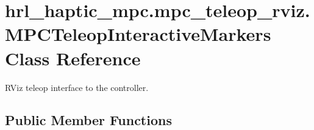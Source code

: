 \hypertarget{classhrl__haptic__mpc_1_1mpc__teleop__rviz_1_1_m_p_c_teleop_interactive_markers}{\section{hrl\-\_\-haptic\-\_\-mpc.\-mpc\-\_\-teleop\-\_\-rviz.\-M\-P\-C\-Teleop\-Interactive\-Markers \-Class \-Reference}
\label{classhrl__haptic__mpc_1_1mpc__teleop__rviz_1_1_m_p_c_teleop_interactive_markers}
}


\-R\-Viz teleop interface to the controller.  


\subsection*{\-Public \-Member \-Functions}
